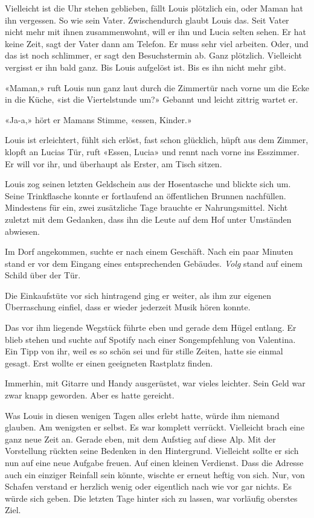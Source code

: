 Vielleicht ist die Uhr stehen geblieben, fällt Louis plötzlich ein, oder
Maman hat ihn vergessen. So wie sein Vater. Zwischendurch glaubt Louis
das. Seit Vater nicht mehr mit ihnen zusammenwohnt, will er ihn und
Lucia selten sehen. Er hat keine Zeit, sagt der Vater dann am Telefon.
Er muss sehr viel arbeiten. Oder, und das ist noch schlimmer, er sagt
den Besuchstermin ab. Ganz plötzlich. Vielleicht vergisst er ihn bald
ganz. Bis Louis aufgelöst ist. Bis es ihn nicht mehr gibt.

«Maman,» ruft Louis nun ganz laut durch die Zimmertür nach vorne um die
Ecke in die Küche, «ist die Viertelstunde um?» Gebannt und leicht
zittrig wartet er.

«Ja-a,» hört er Mamans Stimme, «essen, Kinder.»

Louis ist erleichtert, fühlt sich erlöst, fast schon glücklich, hüpft
aus dem Zimmer, klopft an Lucias Tür, ruft «Essen, Lucia» und rennt nach
vorne ins Esszimmer. Er will vor ihr, und überhaupt als Erster, am Tisch
sitzen.

Louis zog seinen letzten Geldschein aus der Hosentasche und blickte sich
um. Seine Trinkflasche konnte er fortlaufend an öffentlichen Brunnen
nachfüllen. Mindestens für ein, zwei zusätzliche Tage brauchte er
Nahrungsmittel. Nicht zuletzt mit dem Gedanken, dass ihn die Leute auf
dem Hof unter Umständen abwiesen.

Im Dorf angekommen, suchte er nach einem Geschäft. Nach ein paar Minuten
stand er vor dem Eingang eines entsprechenden Gebäudes. \emph{Volg}
stand auf einem Schild über der Tür.

Die Einkaufstüte vor sich hintragend ging er weiter, als ihm zur eigenen
Überraschung einfiel, dass er wieder jederzeit Musik hören konnte.

Das vor ihm liegende Wegstück führte eben und gerade dem Hügel entlang.
Er blieb stehen und suchte auf Spotify nach einer Songempfehlung von
Valentina. Ein Tipp von ihr, weil es so schön sei und für stille Zeiten,
hatte sie einmal gesagt. Erst wollte er einen geeigneten Rastplatz
finden.

Immerhin, mit Gitarre und Handy ausgerüstet, war vieles leichter. Sein
Geld war zwar knapp geworden. Aber es hatte gereicht.

Was Louis in diesen wenigen Tagen alles erlebt hatte, würde ihm niemand
glauben. Am wenigsten er selbst. Es war komplett verrückt. Vielleicht
brach eine ganz neue Zeit an. Gerade eben, mit dem Aufstieg auf diese
Alp. Mit der Vorstellung rückten seine Bedenken in den Hintergrund.
Vielleicht sollte er sich nun auf eine neue Aufgabe freuen. Auf einen
kleinen Verdienst. Dass die Adresse auch ein einziger Reinfall sein
könnte, wischte er erneut heftig von sich. Nur, von Schafen verstand er
herzlich wenig oder eigentlich nach wie vor gar nichts. Es würde sich
geben. Die letzten Tage hinter sich zu lassen, war vorläufig oberstes
Ziel.

